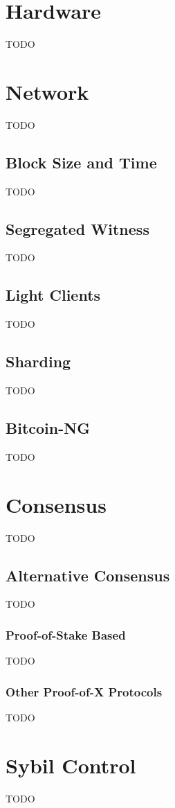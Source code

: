 \documentclass{article}
\begin{document}
\section{Hardware}
TODO


\section{Network}
TODO

\subsection{Block Size and Time}
TODO

\subsection{Segregated Witness}
TODO

\subsection{Light Clients}
TODO

\subsection{Sharding}
TODO

\subsection{Bitcoin-NG}
TODO


\section{Consensus}
TODO

\subsection{Alternative Consensus}
TODO

\subsubsection{Proof-of-Stake Based}
TODO

\subsubsection{Other Proof-of-X Protocols}
TODO


\section{Sybil Control}
TODO
\end{document}
